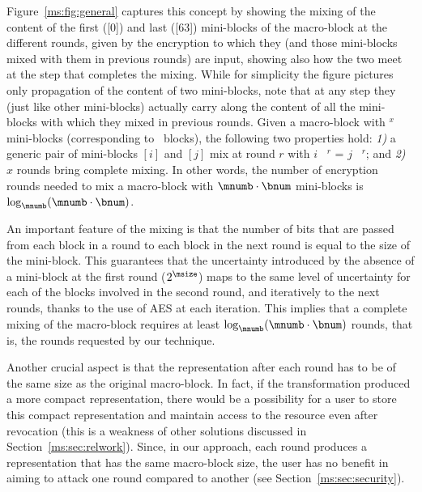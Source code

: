 Figure~\ref{ms:fig:general} captures this concept by showing the mixing of the content of the first ([0]) and last ([63]) mini-blocks of the macro-block at the different rounds, given by the encryption to which they (and those mini-blocks mixed with them in previous rounds) are input, showing also how the two meet at the step that completes the mixing. While for simplicity the figure pictures only propagation of the content of two mini-blocks, note that at any step they (just like other mini-blocks) actually carry along the content of all the mini-blocks with which they mixed in previous rounds. Given a macro-block \macroblock{} with \mnumb$^x$ mini-blocks (corresponding to \bnum\ blocks), the following two properties hold: {\em 1)\/} a generic pair of mini-blocks $[i]$ and $[j]$ mix at round $r$ with $i$ \mydiv\ \mnumb$^r$ = $j$ \mydiv\ \mnumb$^r$; and {\em 2)\/} $x$ rounds bring complete mixing. In other words, the number of encryption rounds needed to mix a macro-block with $\mnumb \cdot \bnum$ mini-blocks is $\log_{\mnumb}(\mnumb\cdot\bnum)$.

An important feature of the mixing is that the number of bits that are passed from each block in a round to each block in the next round is equal to the size of the mini-block. This guarantees that the uncertainty introduced by the absence of a mini-block at the first round ($2^{\msize}$) maps to the same level of uncertainty for each of the blocks involved in the second round, and iteratively to the next rounds, thanks to the use of AES at each iteration. This implies that a complete mixing of the macro-block requires at least  $\log_{\mnumb} (\mnumb \cdot \bnum)$ rounds, that is, the rounds requested by  our technique.

Another crucial aspect is that the representation after each round has to be of the same size as the original macro-block. In fact, if the transformation produced a more compact representation, there would be a possibility for a user to store this compact representation and maintain access to the resource even after revocation (this is a weakness of other solutions discussed in Section~\ref{ms:sec:relwork}). Since, in our approach, each round produces a representation that has the same macro-block size, the user has no benefit in aiming to attack one round compared to another (see Section~\ref{ms:sec:security}).

